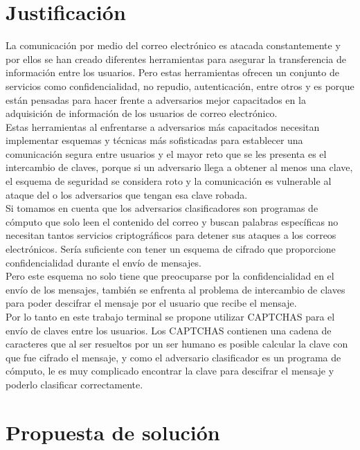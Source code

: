 \documentclass[12pt,oneside,onecolumn,openany]{report}
\begin{document}
\chapter{Justificación}
La comunicación por medio del correo electrónico es atacada constantemente y por ellos se han creado diferentes herramientas para asegurar la transferencia de información entre los usuarios. Pero estas herramientas ofrecen un conjunto de servicios como confidencialidad, no repudio, autenticación, entre otros y es porque están pensadas para hacer frente a adversarios mejor capacitados en la adquisición de información de los usuarios de correo electrónico.\\
Estas herramientas al enfrentarse a adversarios más capacitados necesitan implementar esquemas y técnicas más sofisticadas para establecer una comunicación segura entre usuarios y el mayor reto que se les presenta es el intercambio de claves, porque si un adversario llega a obtener al menos una clave, el esquema de seguridad se considera roto y la comunicación es vulnerable al ataque del o los adversarios que tengan esa clave robada.\\
 Si tomamos en cuenta que los adversarios clasificadores son programas de cómputo que solo leen el contenido del correo y buscan palabras específicas no necesitan tantos servicios criptográficos para detener sus ataques a los correos electrónicos. Sería suficiente con tener un esquema de cifrado que proporcione confidencialidad durante el envío de mensajes.\\
Pero este esquema no solo tiene que preocuparse por la confidencialidad en el envío de los mensajes, también se enfrenta al problema de intercambio de claves para poder descifrar el mensaje por el usuario que recibe el mensaje.\\
Por lo tanto en este trabajo terminal se propone utilizar CAPTCHAS para el envío de claves entre los usuarios. Los CAPTCHAS contienen una cadena de caracteres que al ser resueltos por un ser humano es posible calcular la clave con que fue cifrado el mensaje, y como el adversario clasificador es un programa de cómputo, le es muy complicado encontrar la clave para descifrar el mensaje y poderlo clasificar correctamente.\\
        
\chapter{Propuesta de solución}
\end{document}
